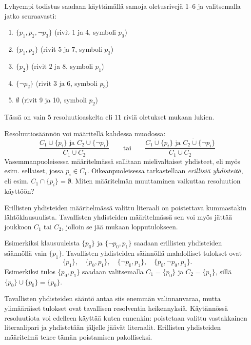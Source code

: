 \documentclass[11pt,a4paper]{amsart}
\begin{document}
\begin{solution}
Lyhyempi todistus saadaan käyttämällä samoja oletusrivejä 1--6 ja
valitsemalla jatko seuraavasti:
\begin{enumerate}[label=\arabic*., start=7, nosep]
\item \(\{p_1,p_2,\neg p_3\}\) (rivit 1 ja 4, symboli \(p_0\))
\item \(\{p_1,p_2\}\) (rivit 5 ja 7, symboli \(p_3\))
\item \(\{p_2\}\) (rivit 2 ja 8, symboli \(p_1\))
\item \(\{\neg p_2\}\) (rivit 3 ja 6, symboli \(p_3\))
\item \(\emptyset\) (rivit 9 ja 10, symboli \(p_2\))
\end{enumerate}
Tässä on vain \(5\) resoluutioaskelta eli \(11\) riviä oletukset mukaan
lukien.
\end{solution}

\begin{exercise}
Resoluutiosäännön voi määritellä kahdessa muodossa:
\[
\frac{C_1 \cup \{p_i\} \text{ ja } C_2 \cup \{\neg p_i\}}{C_1 \cup C_2}
\qquad\text{tai}\qquad
\frac{C_1 \mathbin{\dot\cup} \{p_i\} \text{ ja }
C_2 \mathbin{\dot\cup} \{\neg p_i\}}{C_1 \cup C_2}
\]
Vasemmanpuoleisessa määritelmässä sallitaan mielivaltaiset yhdisteet,
eli myös esim. sellaiset, jossa \(p_i \in C_1\). Oikeanpuoleisessa
tarkastellaan \emph{erillisiä yhdisteitä}, eli esim.
\(C_1 \cap \{p_i\} = \emptyset\). Miten määritelmän muuttaminen
vaikuttaa resoluution käyttöön?
\end{exercise}

\begin{solution}
Erillisten yhdisteiden määritelmässä valittu literaali on poistettava
kummastakin lähtöklausuulista. Tavallisten yhdisteiden määritelmässä
sen voi myös jättää joukkoon \(C_1\) tai \(C_2\), jolloin se jää mukaan
lopputulokseen.

Esimerkiksi klausuuleista \(\{p_0\}\) ja \(\{\neg p_0,p_1\}\)
saadaan erillisten yhdisteiden säännöllä vain \(\{p_1\}\).
Tavallisten yhdisteiden säännöllä mahdolliset tulokset ovat
\[
\{p_1\},\quad \{p_0,p_1\},\quad \{\neg p_0,p_1\},\quad
\{p_0,\neg p_0,p_1\}.
\]
Esimerkiksi tulos \(\{p_0,p_1\}\) saadaan valitsemalla
\(C_1=\{p_0\}\) ja \(C_2=\{p_1\}\), sillä
\(\{p_0\}\cup\{p_0\}=\{p_0\}\).

Tavallisten yhdisteiden sääntö antaa siis enemmän valinnanvaraa,
mutta ylimääräiset tulokset ovat tavallisen resolventin heikennyksiä.
Käytännössä resoluutiota voi edelleen käyttää kuten ennenkin:
poistetaan valittu vastakkainen literaalipari ja yhdistetään jäljelle
jäävät literaalit. Erillisten yhdisteiden määritelmä tekee tämän
poistamisen pakolliseksi.
\end{solution}
\end{document}
